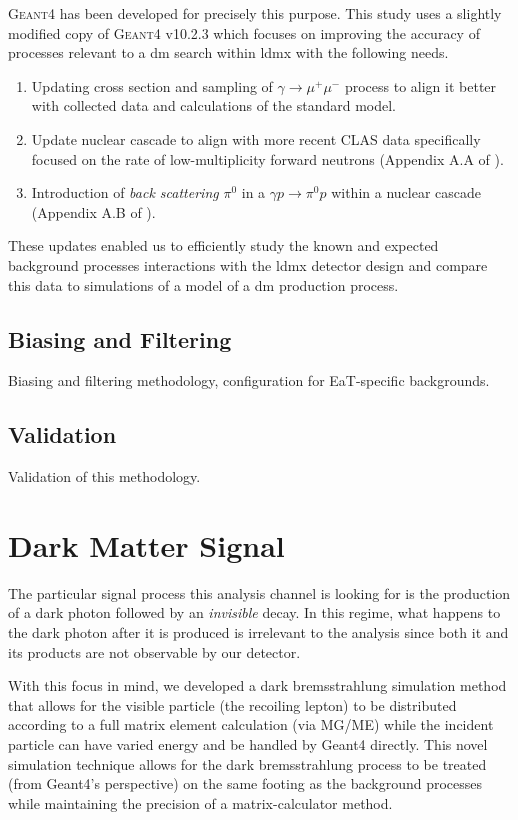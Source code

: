 \textsc{Geant4} \cite{geant4} has been developed for precisely this purpose. This study uses a slightly modified copy of \textsc{Geant4} v10.2.3 which focuses on improving the accuracy of processes relevant to a \ac{dm} search within \ac{ldmx} with the following needs.
\begin{enumerate}
	\item Updating cross section and sampling of $\gamma\to\mu^+\mu^-$ process to align it better with collected data and calculations of the standard model.
	\item Update nuclear cascade to align with more recent CLAS data specifically focused on the rate of low-multiplicity forward neutrons (Appendix A.A of \cite{ldmx-whitepaper}).
	\item Introduction of \emph{back scattering} $\pi^0$ in a $\gamma p \to \pi^0 p$ within a nuclear cascade (Appendix A.B of \cite{ldmx-whitepaper}).
\end{enumerate}
These updates enabled us to efficiently study the known and expected background processes interactions with the \ac{ldmx} detector design and compare this data to simulations of a model of a \ac{dm} production process.

\subsection{Biasing and Filtering}
Biasing and filtering methodology, configuration for EaT-specific backgrounds.

\subsection{Validation}
Validation of this methodology.

\section{Dark Matter Signal}
The particular signal process this analysis channel is looking for is the
production of a dark photon followed by an \emph{invisible} decay. In this
regime, what happens to the dark photon after it is produced is irrelevant
to the analysis since both it and its products are not observable by our
detector.

With this focus in mind, we developed a dark bremsstrahlung simulation method
that allows for the visible particle (the recoiling lepton) to be distributed
according to a full matrix element calculation (via MG/ME) while the incident
particle can have varied energy and be handled by Geant4 directly. This novel
simulation technique allows for the dark bremsstrahlung process to be treated
(from Geant4's perspective) on the same footing as the background processes
while maintaining the precision of a matrix-calculator method.

